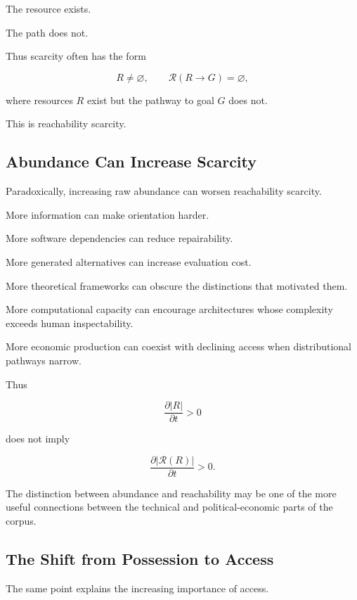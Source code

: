 \documentclass[11pt]{article}
\theoremstyle{remark}
\newcommand{\Reach}{\mathcal{R}}
\begin{document}
The resource exists.

The path does not.

Thus scarcity often has the form

\begin{equation}
R\neq\varnothing,
\qquad
\Reach(R\rightarrow G)=\varnothing,
\end{equation}

where resources $R$ exist but the pathway to goal $G$ does not.

This is reachability scarcity.

\subsection{Abundance Can Increase Scarcity}

Paradoxically, increasing raw abundance can worsen reachability scarcity.

More information can make orientation harder.

More software dependencies can reduce repairability.

More generated alternatives can increase evaluation cost.

More theoretical frameworks can obscure the distinctions that motivated them.

More computational capacity can encourage architectures whose complexity exceeds
human inspectability.

More economic production can coexist with declining access when distributional
pathways narrow.

Thus

\begin{equation}
\frac{\partial |R|}{\partial t}>0
\end{equation}

does not imply

\begin{equation}
\frac{\partial |\Reach(R)|}{\partial t}>0.
\end{equation}

The distinction between abundance and reachability may be one of the more useful
connections between the technical and political-economic parts of the corpus.

\subsection{The Shift from Possession to Access}

The same point explains the increasing importance of access.
\end{document}

